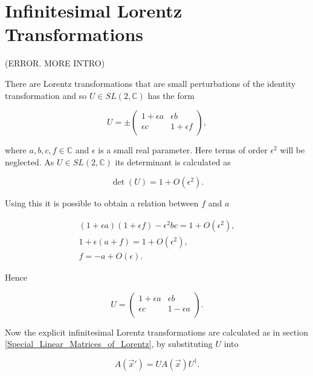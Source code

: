 \section{Infinitesimal Lorentz Transformations}

(ERROR. MORE INTRO)

There are Lorentz transformations that are small perturbations of the identity transformation and so $U \in SL(2,\mathbb{C})$ has the form

\begin{equation}\label{Infinitesimal_Infinitesimal_Lorentz_Transform_Matrix_U}
U = \pm
\left(
\begin{array}{cc}
1 + \epsilon a & \epsilon b \\
\epsilon c & 1 + \epsilon f \\
\end{array}
\right),
\end{equation}

\noindent where $a,b,c,f \in \mathbb{C}$ and $\epsilon$ is a small real parameter. Here terms of order $\epsilon^2$ will be neglected. As $U \in SL(2,\mathbb{C})$ its determinant is calculated as

\begin{equation*}
\det{(U)} = 1 + O(\epsilon^2).
\end{equation*}

\noindent Using this it is possible to obtain a relation between $f$ and $a$

\begin{gather*}
(1 + \epsilon a)(1 + \epsilon f) - \epsilon^2 b c = 1 + O(\epsilon^2), \\
1 + \epsilon (a +f) = 1 + O(\epsilon^2), \\
f = -a + O(\epsilon).
\end{gather*}

\noindent Hence 

\begin{equation*}
U =
\left(
\begin{array}{cc}
1 + \epsilon a & \epsilon b \\
\epsilon c & 1 - \epsilon a \\
\end{array}
\right).
\end{equation*}

Now the explicit infinitesimal Lorentz transformations are calculated as in section \ref{Special_Linear_Matrices_of_Lorentz}, by substituting $U$ into

\begin{equation*}
A(\vec{x}') = U A(\vec{x}) U^{\dagger}.
\end{equation*}

